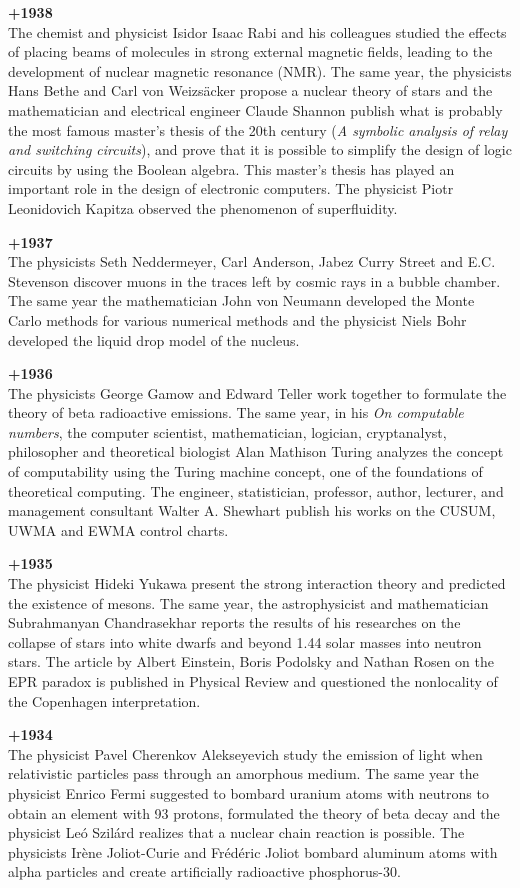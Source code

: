 \textbf{+1938}\\
The chemist and physicist Isidor Isaac Rabi and his colleagues studied the effects of placing beams of molecules in strong external magnetic fields, leading to the development of nuclear magnetic resonance (NMR). The same year, the physicists Hans Bethe and Carl von Weizsäcker propose a nuclear theory of stars and the mathematician and electrical engineer Claude Shannon publish what is probably the most famous master's thesis of the 20th century (\textit{A symbolic analysis of relay and switching circuits}), and prove that it is possible to simplify the design of logic circuits by using the Boolean algebra. This master's thesis has played an important role in the design of electronic computers. The physicist Piotr Leonidovich Kapitza observed the phenomenon of superfluidity.

\textbf{+1937}\\
The physicists Seth Neddermeyer, Carl Anderson, Jabez Curry Street and E.C. Stevenson discover muons in the traces left by cosmic rays in a bubble chamber. The same year the mathematician John von Neumann developed the Monte Carlo methods for various numerical methods and the physicist Niels Bohr developed the liquid drop model of the nucleus.

\textbf{+1936}\\
The physicists George Gamow and Edward Teller work together to formulate the theory of beta radioactive emissions. The same year, in his \textit{On computable numbers}, the computer scientist, mathematician, logician, cryptanalyst, philosopher and theoretical biologist Alan Mathison Turing analyzes the concept of computability using the Turing machine concept, one of the foundations of theoretical computing. The engineer, statistician, professor, author, lecturer, and management consultant Walter A. Shewhart publish his works on the CUSUM, UWMA and EWMA control charts.

\textbf{+1935}\\
The physicist Hideki Yukawa present the strong interaction theory and predicted the existence of mesons. The same year, the astrophysicist and mathematician Subrahmanyan Chandrasekhar reports the results of his researches on the collapse of stars into white dwarfs and beyond 1.44 solar masses into neutron stars. The article by Albert Einstein, Boris Podolsky and Nathan Rosen on the EPR paradox is published in Physical Review and questioned the nonlocality of the Copenhagen interpretation.

\textbf{+1934}\\
The physicist Pavel Cherenkov Alekseyevich study the emission of light when relativistic particles pass through an amorphous medium. The same year the physicist Enrico Fermi suggested to bombard uranium atoms with neutrons to obtain an element with 93 protons, formulated the theory of beta decay and the physicist Leó Szilárd realizes that a nuclear chain reaction is possible. The physicists Irène Joliot-Curie and Frédéric Joliot bombard aluminum atoms with alpha particles and create artificially radioactive phosphorus-30.

